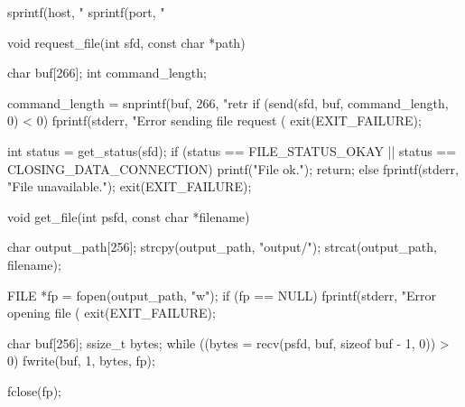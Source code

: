 \documentclass[11pt,a4paper]{article}
\begin{document}
\begin{c-darktheme}
{    sprintf(host, "%
    sprintf(port, "%
}

void request_file(int sfd, const char *path)
{
    char buf[266];
    int command_length;

    command_length = snprintf(buf, 266, "retr %
    if (send(sfd, buf, command_length, 0) < 0)
    {
        fprintf(stderr, "Error sending file request (%
        exit(EXIT_FAILURE);
    }

    int status = get_status(sfd);
    if (status == FILE_STATUS_OKAY || status == CLOSING_DATA_CONNECTION)
    {
        printf("File ok.\n");
        return;
    }
    else
    {
        fprintf(stderr, "File unavailable.\n");
        exit(EXIT_FAILURE);
    }
}

void get_file(int psfd, const char *filename)
{
    char output_path[256];
    strcpy(output_path, "output/");
    strcat(output_path, filename);

    FILE *fp = fopen(output_path, "w");
    if (fp == NULL)
    {
        fprintf(stderr, "Error opening file (%
        exit(EXIT_FAILURE);
    }

    char buf[256];
    ssize_t bytes;
    while ((bytes = recv(psfd, buf, sizeof buf - 1, 0)) > 0)
    {
        fwrite(buf, 1, bytes, fp);
    }

    fclose(fp);
}
\end{c-darktheme}
\end{document}
